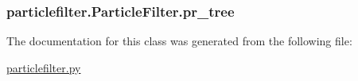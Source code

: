 \subsubsection[{pr\+\_\+tree}]{\setlength{\rightskip}{0pt plus 5cm}particlefilter.\+Particle\+Filter.\+pr\+\_\+tree}\label{classparticlefilter_1_1ParticleFilter_ad105183603f7e2a9b31ad9b51a904876}


The documentation for this class was generated from the following file\+:\begin{DoxyCompactItemize}
\item 
\hyperlink{particlefilter_8py}{particlefilter.\+py}\end{DoxyCompactItemize}
